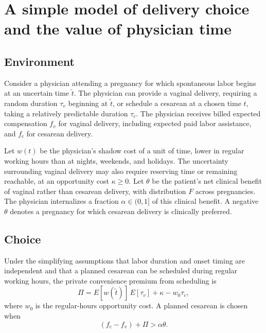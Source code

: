 
\section{A simple model of delivery choice and the value of physician time}
\label{sec:model}
\setcounter{equation}{0}
\renewcommand{\theequation}{A\arabic{equation}}

\subsection{Environment}

Consider a physician attending a pregnancy for which spontaneous labor begins at an uncertain time $\tilde t$. The physician can provide a vaginal delivery, requiring a random duration $\tau_v$ beginning at $\tilde t$, or schedule a cesarean at a chosen time $t$, taking a relatively predictable duration $\tau_c$. The physician receives billed expected compensation $f_v$ for vaginal delivery, including expected paid labor assistance, and $f_c$ for cesarean delivery.

Let $w(t)$ be the physician's shadow cost of a unit of time, lower in regular working hours than at nights, weekends, and holidays. The uncertainty surrounding vaginal delivery may also require reserving time or remaining reachable, at an opportunity cost $\kappa\geq0$. Let $\theta$ be the patient's net clinical benefit of vaginal rather than cesarean delivery, with distribution $F$ across pregnancies. The physician internalizes a fraction $\alpha\in(0,1]$ of this clinical benefit. A negative $\theta$ denotes a pregnancy for which cesarean delivery is clinically preferred.

\subsection{Choice}

Under the simplifying assumptions that labor duration and onset timing are independent and that a planned cesarean can be scheduled during regular working hours, the private convenience premium from scheduling is
\begin{equation}
\Pi = E[w(\tilde t)]\,E[\tau_v]+\kappa-w_0\tau_c,
\label{eq:premium}
\end{equation}
where $w_0$ is the regular-hours opportunity cost. A planned cesarean is chosen when
\begin{equation}
(f_c-f_v)+\Pi>\alpha\theta.
\label{eq:choice}
\end{equation}

